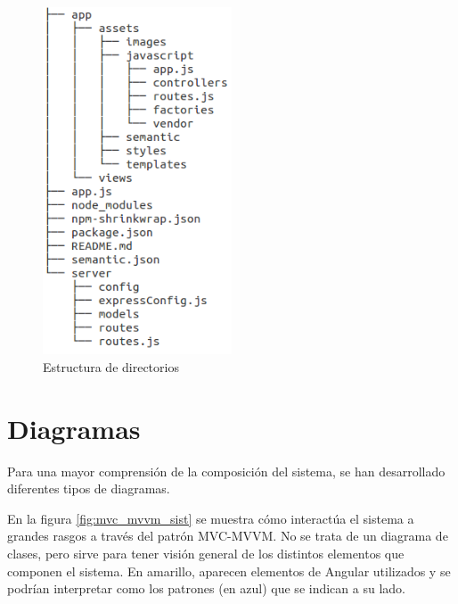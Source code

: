 \begin{figure}[htbp] 
    \centering
    \includegraphics[width=0.5\textwidth]{figuras/directorios.png}
    \caption{Estructura de directorios}
    \label{fig:directorios}
\end{figure}	

\section{Diagramas}
Para una mayor comprensión de la composición del sistema, se han desarrollado diferentes tipos de diagramas.


En la figura \ref{fig:mvc_mvvm_sist} se muestra cómo interactúa el sistema a grandes rasgos a través del patrón MVC-MVVM. No se trata de un diagrama de clases, pero sirve para tener visión general de los distintos elementos que componen el sistema. En amarillo, aparecen elementos de Angular utilizados y se podrían interpretar como los patrones (en azul) que se indican a su lado.




